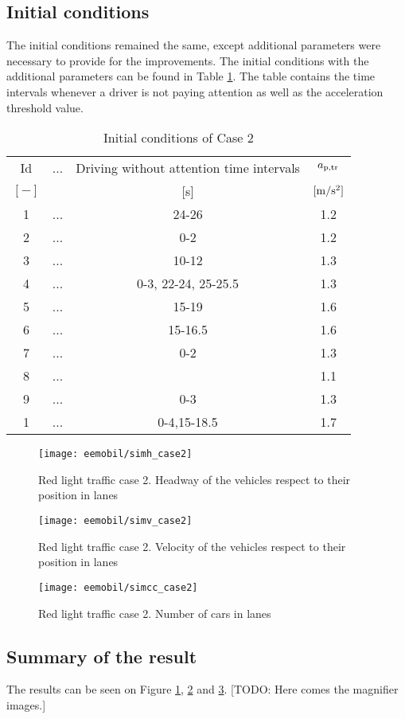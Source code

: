 		\subsection*{Initial conditions}
		The initial conditions remained the same, except additional parameters were necessary to provide for the improvements. The initial conditions with the additional parameters can be found in Table \ref{tab:new_array}. The table contains the time intervals whenever a driver is not paying attention as well as the acceleration threshold value.
		\begin{table}
			\begin{center}
				\begin{tabular}{ |c|c|c|c| }
					\hline
					Id & ... & Driving without attention time intervals & $a_{\rm p,tr}$\\
					$[-]$ & & [s]& $\rm [m/s^2]$\\
					\hline
					1 & ... & 24-26 & 1.2 \\
					2 & ... & 0-2 & 1.2 \\
					3 & ... & 10-12 & 1.3 \\
					4 & ... & 0-3, 22-24, 25-25.5 & 1.3 \\
					5 & ... & 15-19 & 1.6 \\
					6 & ... & 15-16.5 & 1.6 \\
					7 & ... & 0-2 & 1.3 \\
					8 & ... & & 1.1 \\
					9 & ... & 0-3 & 1.3 \\
					1 & ... & 0-4,15-18.5 & 1.7 \\
					\hline
				\end{tabular}
			\end{center}
			\caption{Initial conditions of Case 2}
			\label{tab:new_array}
		\end{table}
		\begin{figure}
			\centering
			\texttt{[image: eemobil/simh\_case2]}
			\caption{Red light traffic case 2. Headway of the vehicles respect to their position in lanes}
			\label{fig:red_light_situationh2}
		\end{figure}
		\begin{figure}
			\centering
			\texttt{[image: eemobil/simv\_case2]}
			\caption{Red light traffic case 2. Velocity of the vehicles respect to their position in lanes}
			\label{fig:red_light_situationv2}
		\end{figure}
		\begin{figure}
			\centering
			\texttt{[image: eemobil/simcc\_case2]}
			\caption{Red light traffic case 2. Number of cars in lanes }
			\label{fig:red_light_situationcc2}
		\end{figure}
		\subsection*{Summary of the result}
		The results can be seen on Figure \ref{fig:red_light_situationh2}, \ref{fig:red_light_situationv2} and \ref{fig:red_light_situationcc2}.
		[TODO: Here comes the magnifier images.]
